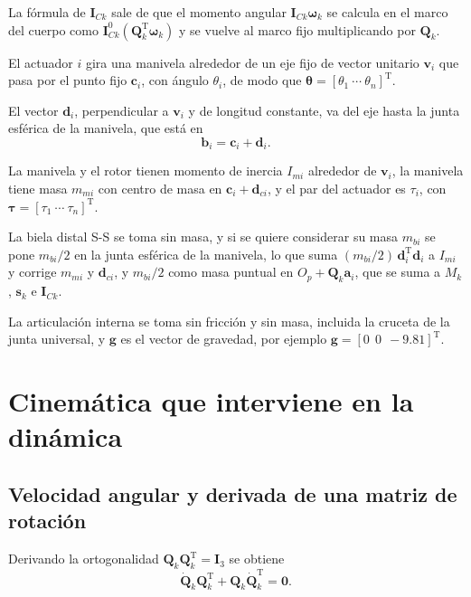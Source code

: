 \documentclass[11pt]{article}
\newcommand{\T}{^{\mathrm{T}}}
\newcommand{\wv}{\boldsymbol{\omega}}
\newcommand{\IC}[1]{\mathbf{I}_{C#1}}
\newcommand{\thv}{\boldsymbol{\theta}}
\newcommand{\tauv}{\boldsymbol{\tau}}
\begin{document}
La fórmula de $\IC{k}$ sale de que el momento angular $\IC{k}\wv_k$ se calcula en el marco del cuerpo como $\IC{k}^0(\mathbf{Q}_k\T\wv_k)$ y se vuelve al marco fijo multiplicando por $\mathbf{Q}_k$.

El actuador $i$ gira una manivela alrededor de un eje fijo de vector unitario $\mathbf{v}_i$ que pasa por el punto fijo $\mathbf{c}_i$, con ángulo $\theta_i$, de modo que $\thv=[\theta_1\ \cdots\ \theta_n]\T$.

El vector $\mathbf{d}_i$, perpendicular a $\mathbf{v}_i$ y de longitud constante, va del eje hasta la junta esférica de la manivela, que está en
\begin{equation}
\mathbf{b}_i=\mathbf{c}_i+\mathbf{d}_i .
\label{eq:bi}
\end{equation}

La manivela y el rotor tienen momento de inercia $I_{mi}$ alrededor de $\mathbf{v}_i$, la manivela tiene masa $m_{mi}$ con centro de masa en $\mathbf{c}_i+\mathbf{d}_{ci}$, y el par del actuador es $\tau_i$, con $\tauv=[\tau_1\ \cdots\ \tau_n]\T$.

La biela distal S-S se toma sin masa, y si se quiere considerar su masa $m_{bi}$ se pone $m_{bi}/2$ en la junta esférica de la manivela, lo que suma $(m_{bi}/2)\,\mathbf{d}_i\T\mathbf{d}_i$ a $I_{mi}$ y corrige $m_{mi}$ y $\mathbf{d}_{ci}$, y $m_{bi}/2$ como masa puntual en $O_p+\mathbf{Q}_k\mathbf{a}_i$, que se suma a $M_k$, $\mathbf{s}_k$ e $\IC{k}$.

La articulación interna se toma sin fricción y sin masa, incluida la cruceta de la junta universal, y $\mathbf{g}$ es el vector de gravedad, por ejemplo $\mathbf{g}=[0\ \ 0\ \ -9.81]\T$.

\section{Cinemática que interviene en la dinámica}

\subsection{Velocidad angular y derivada de una matriz de rotación}

Derivando la ortogonalidad $\mathbf{Q}_k\mathbf{Q}_k\T=\mathbf{I}_3$ se obtiene
\begin{equation}
\dot{\mathbf{Q}}_k\mathbf{Q}_k\T+\mathbf{Q}_k\dot{\mathbf{Q}}_k\T=\mathbf{0}.
\label{eq:QQ}
\end{equation}
\end{document}
